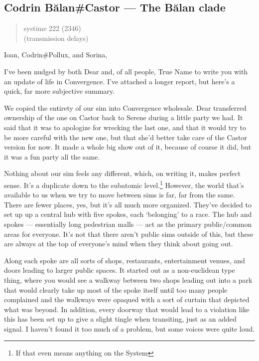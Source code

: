 \hypertarget{codrin-bux103lancastor-the-bux103lan-clade}{%
\subsection{Codrin Bălan\#Castor — The Bălan clade}\label{codrin-bux103lancastor-the-bux103lan-clade}}

\begin{quote}
systime 222 (2346)\\
(transmission delays)
\end{quote}

Ioan, Codrin\#Pollux, and Sorina,

I've been nudged by both Dear and, of all people, True Name to write you with an update of life in Convergence. I've attached a longer report, but here's a quick, far more subjective summary.

We copied the entirety of our sim into Convergence wholesale. Dear transferred ownership of the one on Castor back to Serene during a little party we had. It said that it was to apologize for wrecking the last one, and that it would try to be more careful with the new one, but that she'd better take care of the Castor version for now. It made a whole big show out of it, because of course it did, but it was a fun party all the same.

Nothing about our sim feels any different, which, on writing it, makes perfect sense. It's a duplicate down to the subatomic level.\footnote{If that even means anything on the System} However, the world that's available to us when we try to move between sims is far, far from the same. There are fewer places, yes, but it's all much more organized. They've decided to set up up a central hub with five spokes, each `belonging' to a race. The hub and spokes — essentially long pedestrian malls — act as the primary public/common areas for everyone. It's not that there aren't public sims outside of this, but these are always at the top of everyone's mind when they think about going out.

Along each spoke are all sorts of shops, restaurants, entertainment venues, and doors leading to larger public spaces. It started out as a non-euclidean type thing, where you would see a walkway between two shops leading out into a park that would clearly take up most of the spoke itself until too many people complained and the walkways were opaqued with a sort of curtain that depicted what was beyond. In addition, every doorway that would lead to a violation like this has been set up to give a slight tingle when transiting, just as an added signal. I haven't found it too much of a problem, but some voices were quite loud.

